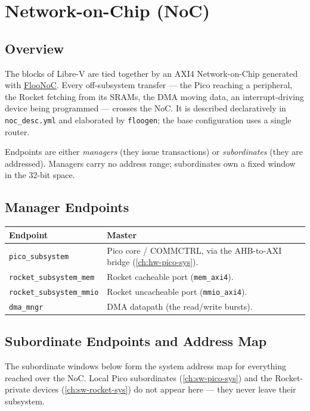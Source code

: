 \chapter{Network-on-Chip (NoC)}\label{ch:hw-noc}

\section{Overview}
The blocks of Libre-V are tied together by an AXI4 Network-on-Chip generated with
\href{https://github.com/pulp-platform/FlooNoC}{FlooNoC}. Every off-subsystem transfer --- the Pico
reaching a peripheral, the Rocket fetching from its SRAMs, the DMA moving data, an interrupt-driving
device being programmed --- crosses the NoC. It is described declaratively in \texttt{noc\_desc.yml} and
elaborated by \texttt{floogen}; the base configuration uses a single router.

Endpoints are either \emph{managers} (they issue transactions) or \emph{subordinates} (they are
addressed). Managers carry no address range; subordinates own a fixed window in the 32-bit space.

\section{Manager Endpoints}

\begin{tabular}{@{}ll@{}}
\toprule
\textbf{Endpoint} & \textbf{Master} \\
\midrule
\texttt{pico\_subsystem}        & Pico core / COMMCTRL, via the AHB-to-AXI bridge (\autoref{ch:hw-pico-sys}). \\
\texttt{rocket\_subsystem\_mem} & Rocket cacheable port (\texttt{mem\_axi4}). \\
\texttt{rocket\_subsystem\_mmio}& Rocket uncacheable port (\texttt{mmio\_axi4}). \\
\texttt{dma\_mngr}              & DMA datapath (the read/write bursts). \\
\bottomrule
\end{tabular}

\section{Subordinate Endpoints and Address Map}
The subordinate windows below form the system address map for everything reached over the NoC. Local
Pico subordinates (\autoref{ch:sw-pico-sys}) and the Rocket-private devices (\autoref{ch:sw-rocket-sys})
do not appear here --- they never leave their subsystem.

